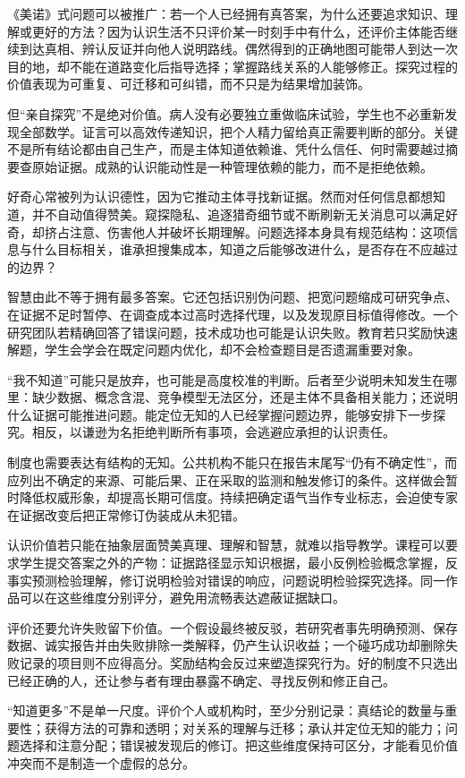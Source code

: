 《美诺》式问题可以被推广：若一个人已经拥有真答案，为什么还要追求知识、理解或更好的方法？因为认识生活不只评价某一时刻手中有什么，还评价主体能否继续到达真相、辨认反证并向他人说明路线。偶然得到的正确地图可能带人到达一次目的地，却不能在道路变化后指导选择；掌握路线关系的人能够修正。探究过程的价值表现为可重复、可迁移和可纠错，而不只是为结果增加装饰。

但“亲自探究”不是绝对价值。病人没有必要独立重做临床试验，学生也不必重新发现全部数学。证言可以高效传递知识，把个人精力留给真正需要判断的部分。关键不是所有结论都由自己生产，而是主体知道依赖谁、凭什么信任、何时需要越过摘要查原始证据。成熟的认识能动性是一种管理依赖的能力，而不是拒绝依赖。

好奇心常被列为认识德性，因为它推动主体寻找新证据。然而对任何信息都想知道，并不自动值得赞美。窥探隐私、追逐猎奇细节或不断刷新无关消息可以满足好奇，却挤占注意、伤害他人并破坏长期理解。问题选择本身具有规范结构：这项信息与什么目标相关，谁承担搜集成本，知道之后能够改进什么，是否存在不应越过的边界？

智慧由此不等于拥有最多答案。它还包括识别伪问题、把宽问题缩成可研究争点、在证据不足时暂停、在调查成本过高时选择代理，以及发现原目标值得修改。一个研究团队若精确回答了错误问题，技术成功也可能是认识失败。教育若只奖励快速解题，学生会学会在既定问题内优化，却不会检查题目是否遗漏重要对象。

“我不知道”可能只是放弃，也可能是高度校准的判断。后者至少说明未知发生在哪里：缺少数据、概念含混、竞争模型无法区分，还是主体不具备相关能力；还说明什么证据可能推进问题。能定位无知的人已经掌握问题边界，能够安排下一步探究。相反，以谦逊为名拒绝判断所有事项，会逃避应承担的认识责任。

制度也需要表达有结构的无知。公共机构不能只在报告末尾写“仍有不确定性”，而应列出不确定的来源、可能后果、正在采取的监测和触发修订的条件。这样做会暂时降低权威形象，却提高长期可信度。持续把确定语气当作专业标志，会迫使专家在证据改变后把正常修订伪装成从未犯错。

认识价值若只能在抽象层面赞美真理、理解和智慧，就难以指导教学。课程可以要求学生提交答案之外的产物：证据路径显示知识根据，最小反例检验概念掌握，反事实预测检验理解，修订说明检验对错误的响应，问题说明检验探究选择。同一作品可以在这些维度分别评分，避免用流畅表达遮蔽证据缺口。

评价还要允许失败留下价值。一个假设最终被反驳，若研究者事先明确预测、保存数据、诚实报告并由失败排除一类解释，仍产生认识收益；一个碰巧成功却删除失败记录的项目则不应得高分。奖励结构会反过来塑造探究行为。好的制度不只选出已经正确的人，还让参与者有理由暴露不确定、寻找反例和修正自己。

\begin{argumentbox}
“知道更多”不是单一尺度。评价个人或机构时，至少分别记录：真结论的数量与重要性；获得方法的可靠和透明；对关系的理解与迁移；承认并定位无知的能力；问题选择和注意分配；错误被发现后的修订。把这些维度保持可区分，才能看见价值冲突而不是制造一个虚假的总分。
\end{argumentbox}


